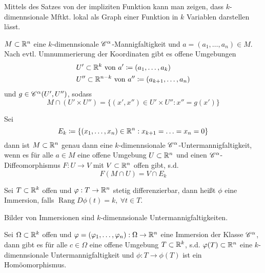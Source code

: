 Mittels des Satzes von der impliziten Funktion kann man zeigen, dass $k$-dimennsionale Mftkt. lokal als Graph einer Funktion in $k$ Variablen darstellen lässt. 
\begin{satz} $M\subset \mathbb{R}^n$ eine $k$-dimennsionale $\mathscr{C}^\alpha$-Mannigfaltigkeit und $a=(a_1,\ldots,a_n)\in M$. Nach evtl. Umnummerierung der Koordinaten gibt es offene Umgebungen 
    \begin{align*}
        & U'\subset \mathbb{R}^k \text{ von } a'\coloneqq (a_1,\ldots,a_k) \\
        & U'' \subset \mathbb{R}^{n-k} \text{ von } a''\coloneqq (a_{k+1},\ldots,a_n)
    \end{align*}
    und $g\in \mathscr{C}^\alpha(U',U'')$, sodass 
    \[
    M \cap (U'\times U'') = \{ (x',x'')\in U'\times U'' : x'' = g(x')\}     
    \]
\end{satz}
\begin{satz}
    Sei
    \[
    E_k \coloneqq \{(x_1,\ldots,x_n)\in \mathbb{R}^n : x_{k+1}=\ldots=x_n = 0\}    
    \]
    dann ist $M\subset \mathbb{R}^n$ genau dann eine $k$-dimennsionale $\mathscr{C}^\alpha$-Untermannigfaltigkeit, wenn es für alle $a\in M$ eine offene Umgebung $U\subset \mathbb{R}^n$ und einen $\mathscr{C}^\alpha$-Diffeomorphismus $F:U\to V$ mit $V\subset \mathbb{R}^n$ offen gibt, s.d. 
    \[
    F(M\cap U) = V\cap E_k    
    \] 
\end{satz}
\begin{defn}
    Sei $T\subset \mathbb{R}^k$ offen und $\varphi:T\to \mathbb{R}^n$ stetig differenzierbar, dann heißt $\phi$ eine Immersion, falls $\operatorname{Rang} D\phi(t) = k, \ \forall t\in T$.
\end{defn}
Bilder von Immersionen sind $k$-dimennsionale Untermannigfaltigkeiten. 
\begin{satz}
    Sei $\Omega\subset \mathbb{R}^k$ offen und $\varphi=(\varphi_1,\ldots,\varphi_n):\Omega\to \mathbb{R}^n$ eine Immersion der Klasse $\mathscr{C}^\alpha$, dann gibt es für alle $c\in \Omega$ eine offene Umgebung
    $T\subset \mathbb{R}^k$, s.d. $\varphi(T)\subset \mathbb{R}^n$ eine $k$-dimennsionale Untermannigfaltigkeit und $\phi:T\to \phi(T)$ ist ein Homöomorphismus. 
\end{satz}
